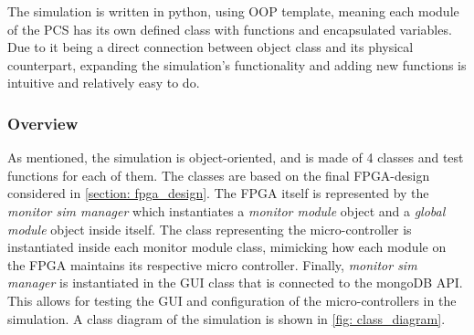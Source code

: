 \documentclass[main.tex]{subfiles}
\begin{document}
The simulation is written in python, using OOP template, meaning each module of the PCS has its own defined class with functions and encapsulated variables. Due to it being a direct connection between object class and its physical counterpart, expanding the simulation's functionality and adding new functions is intuitive and relatively easy to do.

\subsubsection{Overview}
As mentioned, the simulation is object-oriented, and is made of 4 classes and test functions for each of them. The classes are based on the final FPGA-design considered in \ref{section: fpga_design}. The FPGA itself is represented by the \textit{monitor sim manager} which instantiates a \textit{monitor module} object and a \textit{global module} object inside itself. The class representing the micro-controller is instantiated inside each monitor module class, mimicking how each module on the FPGA maintains its respective micro controller. Finally, \textit{monitor sim manager} is instantiated in the GUI class that is connected to the mongoDB API. This allows for testing the GUI and configuration of the micro-controllers in the simulation.  A class diagram of the simulation is shown in \ref{fig: class_diagram}.
\end{document}

